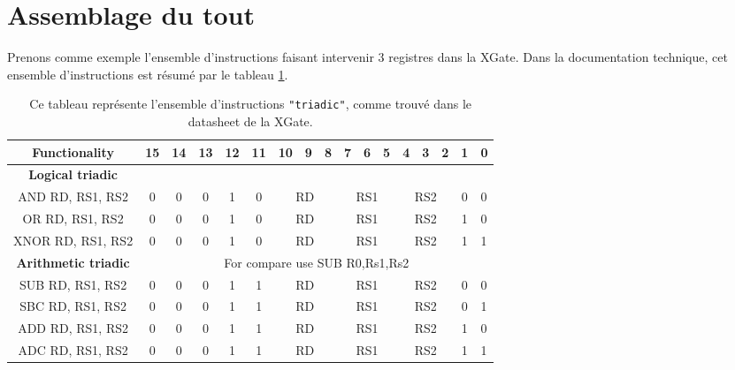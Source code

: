 \section{Assemblage du tout}

Prenons comme exemple l'ensemble d'instructions faisant intervenir 3 registres dans la XGate. Dans la documentation technique, cet ensemble d'instructions est résumé par le tableau \ref{tab:triadic}.

\begin{table}[!h]
\begin{center}
\begin{tabularx}{1.1 \columnwidth}{|c|c|c|c|c|c|c|c|c|c|c|c|c|c|c|c|X|} 
\hline
\bf Functionality & \bf 15 & \bf 14 & \bf 13 & \bf 12 & \bf 11 & \bf 10 & \bf 9 & \bf 8 & \bf 7 & \bf 6 & \bf 5 & \bf 4 & \bf 3 & \bf 2 & \bf 1 & \bf 0\\  \hline
\bf Logical triadic & \multicolumn{16}{c|}{ } \\ \hline
AND RD, RS1, RS2 & 0 & 0 & 0 & 1 & 0 & \multicolumn{3}{c|}{RD} & \multicolumn{3}{c|}{RS1} & \multicolumn{3}{c|}{RS2} & 0 & 0 \\ \hline
OR RD, RS1, RS2 & 0 & 0 & 0 & 1 & 0 & \multicolumn{3}{c|}{RD} &  \multicolumn{3}{c|}{RS1} & \multicolumn{3}{c|}{RS2} & 1 & 0 \\ \hline
XNOR RD, RS1, RS2 & 0 & 0 & 0 & 1 & 0 & \multicolumn{3}{c|}{RD} & \multicolumn{3}{c|}{RS1} & \multicolumn{3}{c|}{RS2} & 1 & 1 \\ \hline
\bf Arithmetic triadic & \multicolumn{16}{c|}{For compare use SUB R0,Rs1,Rs2} \\ \hline
SUB RD, RS1, RS2 & 0 & 0 & 0 & 1 & 1 & \multicolumn{3}{c|}{RD} & \multicolumn{3}{c|}{RS1} & \multicolumn{3}{c|}{RS2} & 0 & 0 \\ \hline
SBC RD, RS1, RS2 & 0 & 0 & 0 & 1 & 1 & \multicolumn{3}{c|}{RD} & \multicolumn{3}{c|}{RS1} & \multicolumn{3}{c|}{RS2} & 0 & 1 \\ \hline
ADD RD, RS1, RS2 & 0 & 0 & 0 & 1 & 1 & \multicolumn{3}{c|}{RD} & \multicolumn{3}{c|}{RS1} & \multicolumn{3}{c|}{RS2} & 1 & 0 \\ \hline
ADC RD, RS1, RS2 & 0 & 0 & 0 & 1 & 1 & \multicolumn{3}{c|}{RD} & \multicolumn{3}{c|}{RS1} & \multicolumn{3}{c|}{RS2} & 1 & 1 \\ \hline
\end{tabularx}
\caption{Ce tableau représente l'ensemble d'instructions  {\tt "triadic"}, comme trouvé dans le datasheet de la XGate.}
\label{tab:triadic}
\end{center}
\end{table}


